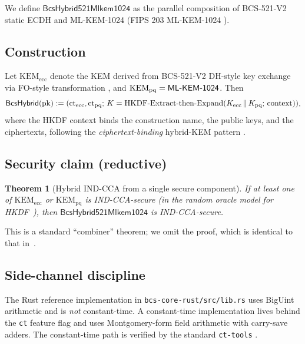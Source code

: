 \documentclass[11pt,a4paper]{article}
\theoremstyle{plain}
\newtheorem{theorem}{Theorem}
\theoremstyle{definition}
\newcommand{\BCSV}{\textsf{BCS\hbox{-}521\hbox{-}V2}}
\newcommand{\MLKEM}{\textsf{ML\hbox{-}KEM\hbox{-}1024}}
\begin{document}
We define $\textsf{BcsHybrid521Mlkem1024}$ as the parallel composition
of \BCSV{} static ECDH and \MLKEM{} (FIPS 203 ML-KEM-1024
\cite{FIPS203}).

\subsection{Construction}

Let $\mathrm{KEM}_{\mathrm{ecc}}$ denote the KEM derived from \BCSV{}
DH-style key exchange via FO-style transformation
\cite{FujisakiOkamoto1999}, and $\mathrm{KEM}_{\mathrm{pq}} = \MLKEM$.
Then
\begin{equation*}
  \textsf{BcsHybrid}(\mathrm{pk}) :=
  (\mathrm{ct}_{\mathrm{ecc}}, \mathrm{ct}_{\mathrm{pq}};\,
    K = \mathrm{HKDF\hbox{-}Extract\hbox{-}then\hbox{-}Expand}
       (K_{\mathrm{ecc}} \,\|\, K_{\mathrm{pq}};\, \mathrm{context})),
\end{equation*}
where the HKDF context binds the construction name, the public keys,
and the ciphertexts, following the
\emph{ciphertext-binding} hybrid-KEM pattern \cite{IETF-Hybrid-KEM-Draft}.

\subsection{Security claim (reductive)}

\begin{theorem}[Hybrid IND-CCA from a single secure component]
If at least one of $\mathrm{KEM}_{\mathrm{ecc}}$ or
$\mathrm{KEM}_{\mathrm{pq}}$ is IND-CCA-secure (in the random oracle
model for HKDF~\cite{HKDF}), then $\textsf{BcsHybrid521Mlkem1024}$ is
IND-CCA-secure.
\end{theorem}

This is a standard ``combiner'' theorem; we omit the proof, which is
identical to that in~\cite{BindelHerold2019}.

\subsection{Side-channel discipline}

The Rust reference implementation in
\texttt{bcs-core-rust/src/lib.rs} uses BigUint arithmetic and is
\emph{not} constant-time. A constant-time implementation lives behind
the \texttt{ct} feature flag and uses Montgomery-form field
arithmetic with carry-save adders. The constant-time path is
verified by the standard \texttt{ct-tools} \cite{TimingAnalyzers}.
\end{document}
